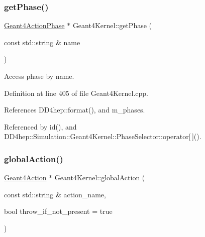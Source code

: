 \hypertarget{class_d_d4hep_1_1_simulation_1_1_geant4_kernel_ada608fd803fba670ab573da9a7a012eb}{}\label{class_d_d4hep_1_1_simulation_1_1_geant4_kernel_ada608fd803fba670ab573da9a7a012eb} 
\subsubsection{\texorpdfstring{get\+Phase()}{getPhase()}}
{\footnotesize\ttfamily \hyperlink{class_d_d4hep_1_1_simulation_1_1_geant4_action_phase}{Geant4\+Action\+Phase} $\ast$ Geant4\+Kernel\+::get\+Phase (\begin{DoxyParamCaption}\item[{const std\+::string \&}]{name }\end{DoxyParamCaption})}



Access phase by name. 



Definition at line 405 of file Geant4\+Kernel.\+cpp.



References D\+D4hep\+::format(), and m\+\_\+phases.



Referenced by id(), and D\+D4hep\+::\+Simulation\+::\+Geant4\+Kernel\+::\+Phase\+Selector\+::operator\mbox{[}$\,$\mbox{]}().

\hypertarget{class_d_d4hep_1_1_simulation_1_1_geant4_kernel_a9142233acf94a391ef926eee86b04c26}{}\label{class_d_d4hep_1_1_simulation_1_1_geant4_kernel_a9142233acf94a391ef926eee86b04c26} 
\subsubsection{\texorpdfstring{global\+Action()}{globalAction()}}
{\footnotesize\ttfamily \hyperlink{class_d_d4hep_1_1_simulation_1_1_geant4_action}{Geant4\+Action} $\ast$ Geant4\+Kernel\+::global\+Action (\begin{DoxyParamCaption}\item[{const std\+::string \&}]{action\+\_\+name,  }\item[{bool}]{throw\+\_\+if\+\_\+not\+\_\+present = {\ttfamily true} }\end{DoxyParamCaption})}



